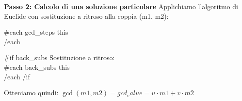 \textbf{Passo 2: Calcolo di una soluzione particolare} 
Applichiamo l'algoritmo di Euclide con sostituzione a ritroso alla coppia ({{m1}}, {{m2}}):

{{#each gcd_steps}}
{{this}} \\
{{/each}}

{{#if back_subs}}
Sostituzione a ritroso:\\
{{#each back_subs}}
{{this}} \\
{{/each}}
{{/if}}

Otteniamo quindi: $\gcd({{m1}}, {{m2}}) = {{gcd_value}} = {{u}} \cdot {{m1}} + {{v}} \cdot {{m2}}$\ 